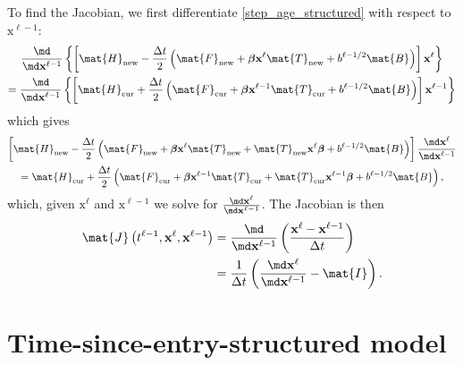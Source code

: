 \documentclass{jpmarticle}
\renewcommand{\vec}[1]{\boldsymbol{\mathrm{#1}}}
\begin{document}
To find the Jacobian, we first differentiate \eqref{step_age_structured}
with respect to $\vec{x}^{\ell - 1}$:
\begin{multline}
  \frac{\md}{\md \vec{x}^{\ell - 1}}
  \left\{
    \left[
      \mat{H}_{\mathrm{new}}
      - \frac{\Delta t}{2}
      \left(
        \mat{F}_{\mathrm{new}}
        + \vec{\beta} \vec{x}^{\ell} \mat{T}_{\mathrm{new}}
        + b^{\ell - 1 / 2} \mat{B}
      \right)
    \right]
    \vec{x}^{\ell}
  \right\}
  \\
  = \frac{\md}{\md \vec{x}^{\ell - 1}}
  \left\{
    \left[
      \mat{H}_{\mathrm{cur}}
      + \frac{\Delta t}{2}
      \left(
        \mat{F}_{\mathrm{cur}}
        + \vec{\beta} \vec{x}^{\ell - 1} \mat{T}_{\mathrm{cur}}
        + b^{\ell - 1 / 2} \mat{B}
      \right)
    \right]
    \vec{x}^{\ell - 1}
  \right\}
\end{multline}
which gives
\begin{multline}
  \left[
    \mat{H}_{\mathrm{new}}
    - \frac{\Delta t}{2}
    \left(
      \mat{F}_{\mathrm{new}}
      + \vec{\beta} \vec{x}^{\ell} \mat{T}_{\mathrm{new}}
      + \mat{T}_{\mathrm{new}} \vec{x}^{\ell} \vec{\beta}
      + b^{\ell - 1 / 2} \mat{B}
    \right)
  \right]
  \frac{\md \vec{x}^{\ell}}{\md \vec{x}^{\ell - 1}}
  \\
  = \mat{H}_{\mathrm{cur}}
  + \frac{\Delta t}{2}
  \left(
    \mat{F}_{\mathrm{cur}}
    + \vec{\beta} \vec{x}^{\ell - 1} \mat{T}_{\mathrm{cur}}
    + \mat{T}_{\mathrm{cur}} \vec{x}^{\ell - 1} \vec{\beta}
    + b^{\ell - 1 / 2} \mat{B}
  \right),
\end{multline}
which, given $\vec{x}^{\ell}$
and $\vec{x}^{\ell - 1}$
we solve for $\frac{\md \vec{x}^{\ell}}{\md \vec{x}^{\ell - 1}}$.
The Jacobian is then
\begin{equation}
  \begin{split}
    \mat{J}\left(t^{\ell - 1}, \vec{x}^{\ell}, \vec{x}^{\ell - 1}\right)
    &= \frac{\md}{\md \vec{x}^{\ell - 1}}
    \left(
      \frac{\vec{x}^{\ell} - \vec{x}^{\ell - 1}}{\Delta t}
    \right)
    \\
    &= \frac{1}{\Delta t} \left(
      \frac{\md \vec{x}^{\ell}}{\md \vec{x}^{\ell - 1}}
      - \mat{I}
    \right).
  \end{split}
\end{equation}


\section{Time-since-entry-structured model}
\end{document}
